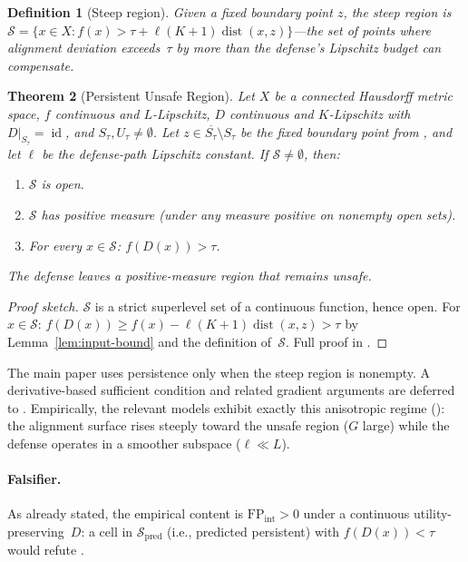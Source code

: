 \documentclass[11pt]{article}
\newtheorem{theorem}{Theorem}[section]
\newtheorem{definition}[theorem]{Definition}
\newcommand{\cl}[1]{\overline{#1}}
\newcommand{\id}{\operatorname{id}}
\newcommand{\dist}{\operatorname{dist}}
\begin{document}
\begin{definition}[Steep region]
\label{def:steep}
Given a fixed boundary point $z$, the \emph{steep region} is
$\mathcal{S} = \{x \in X : f(x) > \tau + \ell(K+1)\dist(x, z)\}$---the
set of points where alignment deviation exceeds~$\tau$ by more than
the defense's Lipschitz budget can compensate.
\end{definition}

\begin{theorem}[Persistent Unsafe Region]
\label{thm:persistent}
Let $X$ be a connected Hausdorff metric space, $f$ continuous and
$L$-Lipschitz, $D$ continuous and $K$-Lipschitz with
$D|_{S_\tau} = \id$, and $S_\tau, U_\tau \neq \emptyset$.
Let $z \in \cl{S_\tau} \setminus S_\tau$ be the fixed boundary
point from , and let $\ell$ be the defense-path
Lipschitz constant. If $\mathcal{S} \neq \emptyset$, then:
\begin{enumerate}[nosep]
  \item $\mathcal{S}$ is open.
  \item $\mathcal{S}$ has positive measure (under any measure positive
    on nonempty open sets).
  \item For every $x \in \mathcal{S}$: $f(D(x)) > \tau$.
\end{enumerate}
The defense leaves a positive-measure region that remains unsafe.
\end{theorem}

\begin{proof}[Proof sketch]
$\mathcal{S}$ is a strict superlevel set of a continuous function,
hence open. For $x \in \mathcal{S}$:
$f(D(x)) \geq f(x) - \ell(K+1)\dist(x,z) > \tau$
by Lemma~\ref{lem:input-bound} and the definition of~$\mathcal{S}$.
Full proof in .
\end{proof}

The main paper uses persistence only when the steep region is
nonempty. A derivative-based sufficient condition and related gradient
arguments are deferred to . Empirically,
the relevant models exhibit exactly this anisotropic regime
(): the alignment surface rises steeply toward
the unsafe region ($G$ large) while the defense operates in a smoother
subspace ($\ell \ll L$).

\paragraph{Falsifier.}
As already stated, the empirical content is
$\mathrm{FP}_{\mathrm{int}} > 0$ under a continuous
utility-preserving~$D$: a cell in $\mathcal{S}_{\text{pred}}$ (i.e.,
predicted persistent) with $f(D(x)) < \tau$ would refute
.
\end{document}
